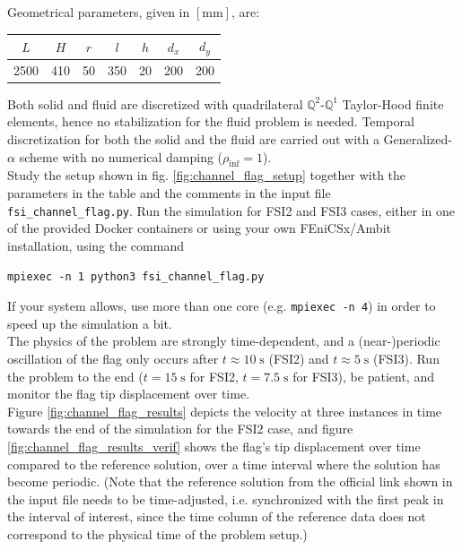 \documentclass[a4paper,12pt]{report}
\begin{document}
Geometrical parameters, given in $[\mathrm{mm}]$, are:
\begin{table}[!h]
\begin{center}
\begin{tabular}{ccccccc}
 $L$    & $H$   & $r$  & $l$   & $h$  & $d_x$ & $d_y$ \\\hline
 2500 & 410 & 50 & 350 & 20 & 200 & 200 
\end{tabular}
\end{center}
\end{table}

Both solid and fluid are discretized with quadrilateral $\mathbb{Q}^2$-$\mathbb{Q}^1$ Taylor-Hood finite elements, hence no stabilization for the fluid problem is needed. Temporal discretization for both the solid and the fluid are carried out with a Generalized-$\alpha$ scheme with no numerical damping ($\rho_{\mathrm{inf}}=1$).\\

Study the setup shown in fig. \ref{fig:channel_flag_setup} together with the parameters in the table and the comments in the input file \verb"fsi_channel_flag.py". Run the simulation for FSI2 and FSI3 cases, either in one of the provided Docker containers or using your own FEniCSx/Ambit installation, using the command
\begin{verbatim}
mpiexec -n 1 python3 fsi_channel_flag.py
\end{verbatim}

If your system allows, use more than one core (e.g. \verb"mpiexec -n 4") in order to speed up the simulation a bit.\\

The physics of the problem are strongly time-dependent, and a (near-)periodic oscillation of the flag only occurs after $t\approx 10\;\mathrm{s}$ (FSI2) and $t\approx 5\;\mathrm{s}$ (FSI3). Run the problem to the end ($t = 15\;\mathrm{s}$ for FSI2, $t = 7.5\;\mathrm{s}$ for FSI3), be patient, and monitor the flag tip displacement over time.\\

Figure \ref{fig:channel_flag_results} depicts the velocity at three instances in time towards the end of the simulation for the FSI2 case, and figure \ref{fig:channel_flag_results_verif} shows the flag's tip displacement over time compared to the reference solution, over a time interval where the solution has become periodic. (Note that the reference solution from the official link shown in the input file needs to be time-adjusted, i.e. synchronized with the first peak in the interval of interest, since the time column of the reference data does not correspond to the physical time of the problem setup.)
\end{document}
